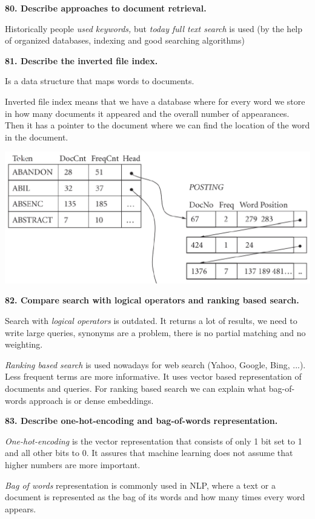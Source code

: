 \textbf{80. Describe approaches to document retrieval.}

Historically people \textit{used keywords,} but \textit{today
\textit{full text search}} is used (by the help of organized databases,
indexing and good searching algorithms)

\textbf{81. Describe the inverted file index.}

Is a data structure that maps words to documents.

Inverted file index means that we have a database where for every word
we store in how many documents it appeared and the overall number of
appearances. Then it has a pointer to the document where we can find the
location of the word in the document.

\includegraphics[width=\columnwidth]{media/image10.png}

\textbf{82. Compare search with logical operators and ranking based
search.}

Search with \textit{logical operators} is outdated. It returns a lot
of results, we need to write large queries, synonyms are a problem,
there is no partial matching and no weighting.

\textit{Ranking based search} is used nowadays for web search (Yahoo,
Google, Bing, ...). Less frequent terms are more informative. It uses
vector based representation of documents and queries. For ranking based
search we can explain what bag-of-words approach is or dense embeddings.

\textbf{83. Describe one-hot-encoding and bag-of-words representation.}

\textit{One-hot-encoding} is the vector representation that consists
of only 1 bit set to 1 and all other bits to 0. It assures that machine
learning does not assume that higher numbers are more important.

\textit{Bag of words} representation is commonly used in NLP, where a
text or a document is represented as the bag of its words and how many
times every word appears.

